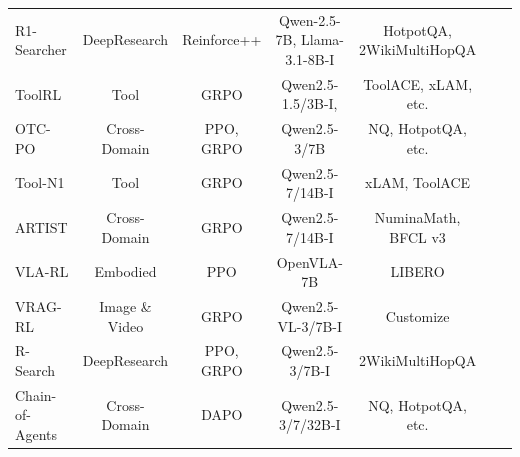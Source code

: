 \documentclass{llmxive}
\providecommand{\Result}{
  \begin{tikzpicture}[baseline=(char.base)]
    \fill[textgreen!50] (0,0) circle (0.18);
    \node[white, font=\scriptsize\rmfamily, inner sep=0pt] (char) at (0,0) {A};
  \end{tikzpicture}
}
\providecommand{\Format}{
  \begin{tikzpicture}[baseline=(char.base)]
    \fill[textred!50] (0,0) circle (0.18);
    \node[white, font=\scriptsize\rmfamily, inner sep=0pt] (char) at (0,0) {F};
  \end{tikzpicture}
}
\providecommand{\Efficient}{
  \begin{tikzpicture}[baseline=(char.base)]
    \fill[textyellow!50] (0,0) circle (0.18);
    \node[white, font=\scriptsize\rmfamily, inner sep=0pt] (char) at (0,0) {E};
  \end{tikzpicture}
}
\providecommand{\Process}{
  \begin{tikzpicture}[baseline=(char.base)]
    \fill[frameblue!50] (0,0) circle (0.18);
    \node[white, font=\scriptsize\rmfamily, inner sep=0pt] (char) at (0,0) {P};
  \end{tikzpicture}
}
\begin{document}
\begin{table}[]
{\begin{tabular}{lcccccc}
R1-Searcher \cite{R1-Searcher} &
  DeepResearch &
  Reinforce++ &
  Qwen-2.5-7B, Llama-3.1-8B-I&
  HotpotQA, 2WikiMultiHopQA &
  \Result\hspace{-0.4em}\Format\hspace{-0.4em}\Process \\

ToolRL \cite{ToolRL} &
  Tool &
  GRPO &
  Qwen2.5-1.5/3B-I, &
  ToolACE, xLAM, etc. &
  \Result\hspace{-0.4em}\Format\hspace{-0.4em}\Process \\

OTC-PO \cite{OTC-PO} &
  Cross-Domain &
  PPO, GRPO &
  Qwen2.5-3/7B &
  NQ, HotpotQA, etc. &
  \Result\hspace{-0.4em}\Format\hspace{-0.4em}\Process\hspace{-0.4em}\Efficient \\

Tool-N1 \cite{Tool-N1} &
  Tool &
  GRPO &
  Qwen2.5-7/14B-I &
  xLAM, ToolACE &
  \Result\hspace{-0.4em}\Format \\

ARTIST \cite{ARTIST} &
  Cross-Domain &
  GRPO &
  Qwen2.5-7/14B-I &
  NuminaMath, BFCL v3 &
  \Result\hspace{-0.4em}\Format\hspace{-0.4em}\Process \\



VLA-RL \cite{VLA-RL} &
  Embodied &
  PPO &
  OpenVLA-7B &
  LIBERO &
  \Result\hspace{-0.4em}\Process \\

VRAG-RL \cite{VRAG-RL} &
  Image \& Video &
  GRPO &
  Qwen2.5-VL-3/7B-I &
  Customize &
  \Result\hspace{-0.4em}\Format\hspace{-0.4em}\Efficient \\



R-Search \cite{R-Search} &
  DeepResearch &
  PPO, GRPO &
  Qwen2.5-3/7B-I &
  2WikiMultiHopQA &
  \Result\hspace{-0.4em}\Format\hspace{-0.4em}\Process \\

Chain-of-Agents \cite{Chain-of-Agents} &
  Cross-Domain &
  DAPO &
  Qwen2.5-3/7/32B-I &
  NQ, HotpotQA, etc. &
  \Result\hspace{-0.4em}\Format \\


\end{tabular}}
\end{table}
\end{document}
